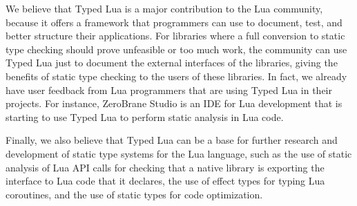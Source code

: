 We believe that Typed Lua is a major contribution to the Lua community,
because it offers a framework that programmers can use to document,
test, and better structure their applications.
For libraries where a full conversion to static type checking should
prove unfeasible or too much work, the community can use Typed Lua
just to document the external interfaces of the libraries,
giving the benefits of static type checking to the users of these
libraries.
In fact, we already have user feedback from Lua programmers that are
using Typed Lua in their projects.
For instance, ZeroBrane Studio is an IDE for Lua development that is
starting to use Typed Lua to perform static analysis in Lua code.

Finally, we also believe that Typed Lua can be a base for further research
and development of static type systems for the Lua language, such as
the use of static analysis of Lua API calls for checking that a native library is
exporting the interface to Lua code that it declares, the use of
effect types for typing Lua coroutines, and the use of static types
for code optimization.

